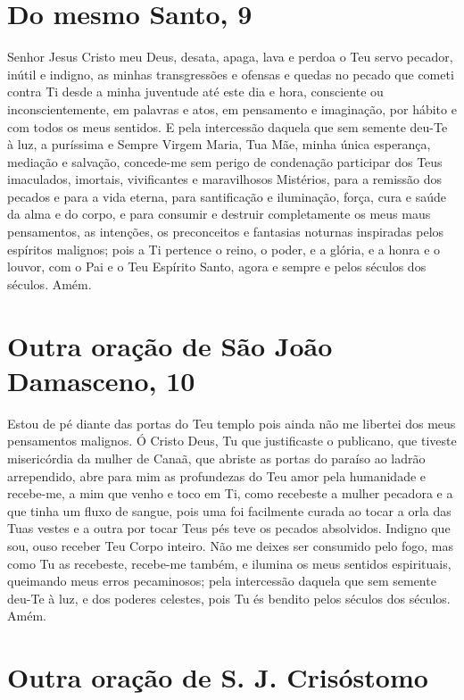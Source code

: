 \documentclass{subfiles}
\begin{document}
\section*{Do mesmo Santo, 9}

Senhor Jesus Cristo meu Deus, desata, apaga, lava e perdoa o Teu servo pecador,
inútil e indigno, as minhas transgressões e ofensas e quedas no pecado que
cometi contra Ti desde a minha juventude até este dia e hora, consciente ou
inconscientemente, em palavras e atos, em pensamento e imaginação, por hábito e
com todos os meus sentidos. E pela intercessão daquela que sem semente deu-Te à
luz, a puríssima e Sempre Virgem Maria, Tua Mãe, minha única esperança, mediação
e salvação, concede-me sem perigo de condenação participar dos Teus imaculados,
imortais, vivificantes e maravilhosos Mistérios, para a remissão dos pecados e
para a vida eterna, para santificação e iluminação, força, cura e saúde da alma
e do corpo, e para consumir e destruir completamente os meus maus pensamentos,
as intenções, os preconceitos e fantasias noturnas inspiradas pelos espíritos
malignos; pois a Ti pertence o reino, o poder, e a glória, e a honra e o louvor,
com o Pai e o Teu Espírito Santo, agora e sempre e pelos séculos dos séculos.
Amém.

\section*{Outra oração de São João Damasceno, 10}

Estou de pé diante das portas do Teu templo pois ainda não me libertei dos meus
pensamentos malignos. Ó Cristo Deus, Tu que justificaste o publicano, que
tiveste misericórdia da mulher de Canaã, que abriste as portas do paraíso ao
ladrão arrependido, abre para mim as profundezas do Teu amor pela humanidade e
recebe-me, a mim que venho e toco em Ti, como recebeste a mulher pecadora e a
que tinha um fluxo de sangue, pois uma foi facilmente curada ao tocar a orla das
Tuas vestes e a outra por tocar Teus pés teve os pecados absolvidos. Indigno que
sou, ouso receber Teu Corpo inteiro. Não me deixes ser consumido pelo fogo, mas
como Tu as recebeste, recebe-me também, e ilumina os meus sentidos espirituais,
queimando meus erros pecaminosos; pela intercessão daquela que sem semente
deu-Te à luz, e dos poderes celestes, pois Tu és bendito pelos séculos dos
séculos. Amém.

\section*{Outra oração de S. J. Crisóstomo}
\end{document}
